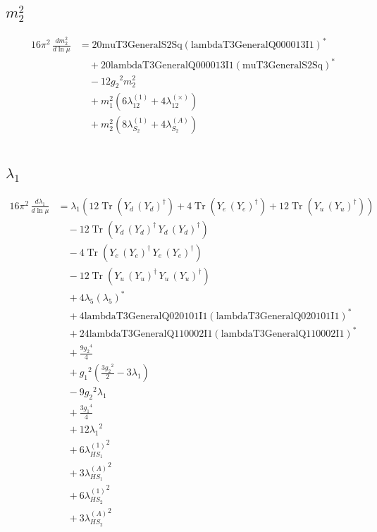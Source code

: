 \documentclass[10pt,a4paper]{article}
\begin{document}
\subsection*{$m_2^2$}
\begin{align*}
16\pi^2\,\frac{d m_2^2}{d\ln\mu} &=20 \text{muT3GeneralS2Sq} \left(\text{lambdaT3GeneralQ000013I1}\right)^{*} \\
&\quad +20 \text{lambdaT3GeneralQ000013I1} \left(\text{muT3GeneralS2Sq}\right)^{*} \\
&\quad -12 {g_2}^2 {m_2^2} \\
&\quad +{m_1^2} (6 {\lambda_{12}^{(1)}}+4 {\lambda_{12}^{(\times)}}) \\
&\quad +{m_2^2} (8 {\lambda_{S_2}^{(1)}}+4 {\lambda_{S_2}^{(A)}}) \\
\end{align*}
\subsection*{$\lambda_1$}
\begin{align*}
16\pi^2\,\frac{d \lambda_1}{d\ln\mu} &={\lambda_1} (12 \operatorname{Tr}\!\left({Y_d}\,\left({Y_d}\right)^{\dagger}\right)+4 \operatorname{Tr}\!\left({Y_e}\,\left({Y_e}\right)^{\dagger}\right)+12 \operatorname{Tr}\!\left({Y_u}\,\left({Y_u}\right)^{\dagger}\right)) \\
&\quad -12 \operatorname{Tr}\!\left({Y_d}\,\left({Y_d}\right)^{\dagger}\,{Y_d}\,\left({Y_d}\right)^{\dagger}\right) \\
&\quad -4 \operatorname{Tr}\!\left({Y_e}\,\left({Y_e}\right)^{\dagger}\,{Y_e}\,\left({Y_e}\right)^{\dagger}\right) \\
&\quad -12 \operatorname{Tr}\!\left({Y_u}\,\left({Y_u}\right)^{\dagger}\,{Y_u}\,\left({Y_u}\right)^{\dagger}\right) \\
&\quad +4 {\lambda_5} \left({\lambda_5}\right)^{*} \\
&\quad +4 \text{lambdaT3GeneralQ020101I1} \left(\text{lambdaT3GeneralQ020101I1}\right)^{*} \\
&\quad +24 \text{lambdaT3GeneralQ110002I1} \left(\text{lambdaT3GeneralQ110002I1}\right)^{*} \\
&\quad +\frac{9 {g_2}^4}{4} \\
&\quad +{g_1}^2 \left(\frac{3 {g_2}^2}{2}-3 {\lambda_1}\right) \\
&\quad -9 {g_2}^2 {\lambda_1} \\
&\quad +\frac{3 {g_1}^4}{4} \\
&\quad +12 {\lambda_1}^2 \\
&\quad +6 {\lambda_{HS_1}^{(1)}}^2 \\
&\quad +3 {\lambda_{HS_1}^{(A)}}^2 \\
&\quad +6 {\lambda_{HS_2}^{(1)}}^2 \\
&\quad +3 {\lambda_{HS_2}^{(A)}}^2 \\
\end{align*}
\end{document}
